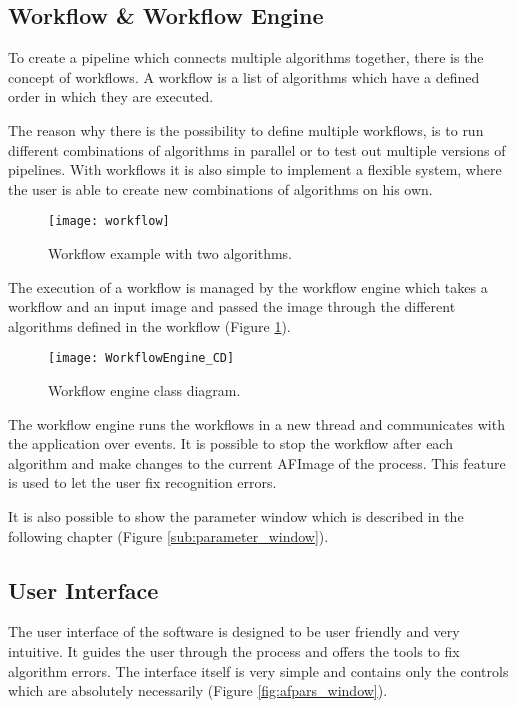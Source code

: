 \pagebreak
\subsection{Workflow \& Workflow Engine}
To create a pipeline which connects multiple algorithms together, there is the concept of workflows. A workflow is a list of algorithms which have a defined order in which they are executed.

The reason why there is the possibility to define multiple workflows, is to run different combinations of algorithms in parallel or to test out multiple versions of pipelines. With workflows it is also simple to implement a flexible system, where the user is able to create new combinations of algorithms on his own.

\begin{figure}[h]
  \centering
      \texttt{[image: workflow]}
  \caption{Workflow example with two algorithms.}
  \label{fig:Workflow}
\end{figure}

The execution of a workflow is managed by the workflow engine which takes a workflow and an input image and passed the image through the different algorithms defined in the workflow (Figure \ref{fig:Workflow}).

\begin{figure}[h]
  \centering
      \texttt{[image: WorkflowEngine\_CD]}
  \caption{Workflow engine class diagram.}
  \label{fig:WorkflowEngine_CD}
\end{figure}

The workflow engine runs the workflows in a new thread and communicates with the application over events. It is possible to stop the workflow after each algorithm and make changes to the current AFImage of the process. This feature is used to let the user fix recognition errors.

It is also possible to show the parameter window which is described in the following chapter (Figure \ref{sub:parameter_window}).

\pagebreak
\subsection{User Interface}

The user interface of the software is designed to be user friendly and very intuitive. It guides the user through the process and offers the tools to fix algorithm errors. The interface itself is very simple and contains only the controls which are absolutely necessarily (Figure \ref{fig:afpars_window}).

